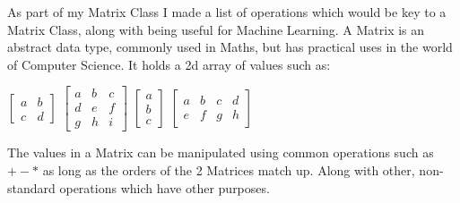 \begin{flushleft}
                As part of my Matrix Class I made a list of operations which would be key to a Matrix Class, along with being useful
                for Machine Learning. A Matrix is an abstract data type, commonly used in Maths, but has practical uses in the world
                of Computer Science. It holds a 2d array of values such as: \\ 
                \begin{center}
                $\begin{bmatrix}
                    a & b\\
                    c & d
                \end{bmatrix}$ 
                $\begin{bmatrix}
                    a & b & c \\
                    d & e & f \\
                    g & h & i 
                \end{bmatrix}$ 
                $\begin{bmatrix}
                    a \\
                    b \\
                    c  
                \end{bmatrix}$ 
                $\begin{bmatrix}
                    a & b & c & d\\
                    e & f & g & h
                \end{bmatrix}$ 
                \end{center}
                The values in a Matrix can be manipulated using common operations such as $+ - *$ as long as the orders of the 2 Matrices
                match up. Along with other, non-standard operations which have other purposes.


\end{flushleft}
